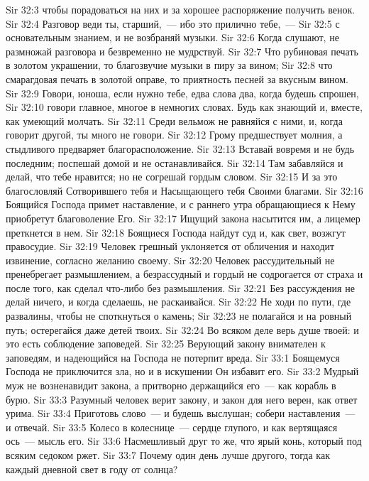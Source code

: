 \vs Sir 32:3 чтобы порадоваться на них и за хорошее распоряжение получить венок.
\vs Sir 32:4 Разговор веди ты, старший,~--- ибо это прилично тебе,~---
\vs Sir 32:5 с основательным знанием, и не возбраняй музыки.
\vs Sir 32:6 Когда слушают, не размножай разговора и безвременно не мудрствуй.
\vs Sir 32:7 Что рубиновая печать в золотом украшении, то благозвучие музыки в пиру за вином;
\vs Sir 32:8 что смарагдовая печать в золотой оправе, то приятность песней за вкусным вином.
\vs Sir 32:9 Говори, юноша, если нужно тебе, едва слова два, когда будешь спрошен,
\vs Sir 32:10 говори главное, многое в немногих словах. Будь как знающий и, вместе, как умеющий молчать.
\vs Sir 32:11 Среди вельмож не равняйся с ними, и, когда говорит другой, ты много не говори.
\vs Sir 32:12 Грому предшествует молния, а стыдливого предваряет благорасположение.
\vs Sir 32:13 Вставай вовремя и не будь последним; поспешай домой и не останавливайся.
\vs Sir 32:14 Там забавляйся и делай, что тебе нравится; но не согрешай гордым словом.
\vs Sir 32:15 И за это благословляй Сотворившего тебя и Насыщающего тебя Своими благами.
\rsbpar\vs Sir 32:16 Боящийся Господа примет наставление, и с раннего утра обращающиеся к Нему приобретут благоволение Его.
\vs Sir 32:17 Ищущий закона насытится им, а лицемер преткнется в нем.
\vs Sir 32:18 Боящиеся Господа найдут суд и, как свет, возжгут правосудие.
\vs Sir 32:19 Человек грешный уклоняется от обличения и находит извинение, согласно желанию своему.
\vs Sir 32:20 Человек рассудительный не пренебрегает размышлением, а безрассудный и гордый не содрогается от страха и после того, как сделал что-либо без размышления.
\vs Sir 32:21 Без рассуждения не делай ничего, и когда сделаешь, не раскаивайся.
\vs Sir 32:22 Не ходи по пути, где развалины, чтобы не споткнуться о камень;
\vs Sir 32:23 не полагайся и на ровный путь; остерегайся даже детей твоих.
\vs Sir 32:24 Во всяком деле верь душе твоей: и это есть соблюдение заповедей.
\vs Sir 32:25 Верующий закону внимателен к заповедям, и надеющийся на Господа не потерпит вреда.
\vs Sir 33:1 Боящемуся Господа не приключится зла, но и в искушении Он избавит его.
\vs Sir 33:2 Мудрый муж не возненавидит закона, а притворно держащийся его~--- как корабль в бурю.
\vs Sir 33:3 Разумный человек верит закону, и закон для него верен, как ответ урима.
\vs Sir 33:4 Приготовь слово~--- и будешь выслушан; собери наставления~--- и отвечай.
\vs Sir 33:5 Колесо в колеснице~--- сердце глупого, и как вертящаяся ось~--- мысль его.
\vs Sir 33:6 Насмешливый друг то же, что ярый конь, который под всяким седоком ржет.
\rsbpar\vs Sir 33:7 Почему один день лучше другого, тогда как каждый дневной свет в году  от солнца?
